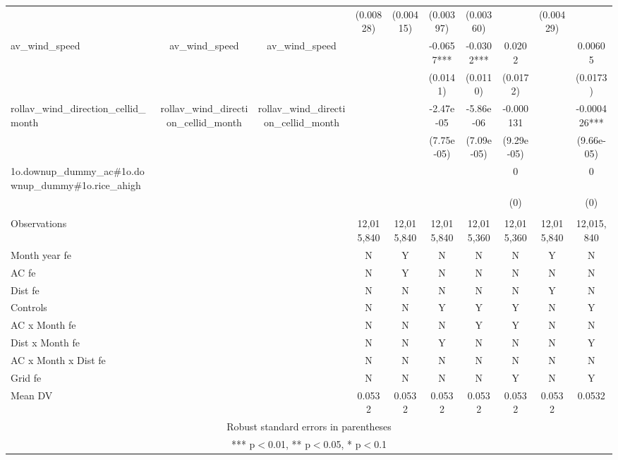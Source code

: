 \documentclass[]{article}
\begin{document}
\begin{tabular}{lccccccccc}
 &  &  & (0.00828) & (0.00415) & (0.00397) & (0.00360) &  & (0.00429) &  \\
av\_wind\_speed & av\_wind\_speed & av\_wind\_speed &  &  & -0.0657*** & -0.0302*** & 0.0202 &  & 0.00605 \\
 &  &  &  &  & (0.0141) & (0.0110) & (0.0172) &  & (0.0173) \\
rollav\_wind\_direction\_cellid\_month & rollav\_wind\_direction\_cellid\_month & rollav\_wind\_direction\_cellid\_month &  &  & -2.47e-05 & -5.86e-06 & -0.000131 &  & -0.000426*** \\
 &  &  &  &  & (7.75e-05) & (7.09e-05) & (9.29e-05) &  & (9.66e-05) \\
1o.downup\_dummy\_ac\#1o.downup\_dummy\#1o.rice\_ahigh &  &  &  &  &  &  & 0 &  & 0 \\
 &  &  &  &  &  &  & (0) &  & (0) \\
 &  &  &  &  &  &  &  &  &  \\
Observations &  &  & 12,015,840 & 12,015,840 & 12,015,840 & 12,015,360 & 12,015,360 & 12,015,840 & 12,015,840 \\
Month year fe &  &  & N & Y & N & N & N & Y & N \\
AC fe &  &  & N & Y & N & N & N & N & N \\
Dist fe &  &  & N & N & N & N & N & Y & N \\
Controls &  &  & N & N & Y & Y & Y & N & Y \\
AC x Month fe &  &  & N & N & N & Y & Y & N & N \\
Dist x Month fe &  &  & N & N & Y & N & N & N & Y \\
AC x Month x Dist fe &  &  & N & N & N & N & N & N & N \\
Grid fe &  &  & N & N & N & N & Y & N & Y \\
 Mean DV &  &  & 0.0532 & 0.0532 & 0.0532 & 0.0532 & 0.0532 & 0.0532 & 0.0532 \\ \hline
\multicolumn{10}{c}{ Robust standard errors in parentheses} \\
\multicolumn{10}{c}{ *** p$<$0.01, ** p$<$0.05, * p$<$0.1} \\
\end{tabular}
\end{document}
